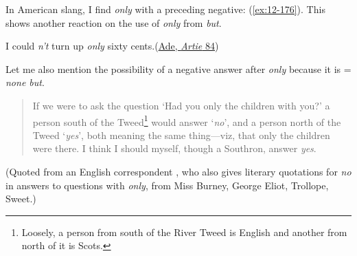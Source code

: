 In American slang, I find \textit{only} with a preceding negative: (\ref{ex:12-176}). This shows another reaction on the use of \textit{only} from \textit{but}.

\ea \label{ex:12-176}
I could \textit{n't} turn up \textit{only} sixty cents.\hfill(\href{https://archive.org/details/artieastorystre01mccugoog/page/n110/mode/2up?view=theater&q=%22turn+up+only+sixty+cents%22}{Ade, \textit{Artie} 84})
\z

Let me also mention the possibility of a negative answer after \textit{only} because it is = \textit{none but}. 
\begin{quote}
If we were to ask the question `Had you only the children with you?' a person south of the Tweed\footnote{Loosely, a person from south of the River Tweed is English and another from north of it is Scots. \eds} would answer `\textit{no}', and a person north of the Tweed `\textit{yes}', both meaning the same thing---viz, that only the children were there. I think I should myself, though a Southron, answer \textit{yes}.
\end{quote}
\noindent (Quoted from an English correspondent \citep[703]{storm1896englische}%
, who also gives literary quotations for \textit{no} in answers to questions with \textit{only}, from Miss Burney, George Eliot, Trollope, Sweet.)
